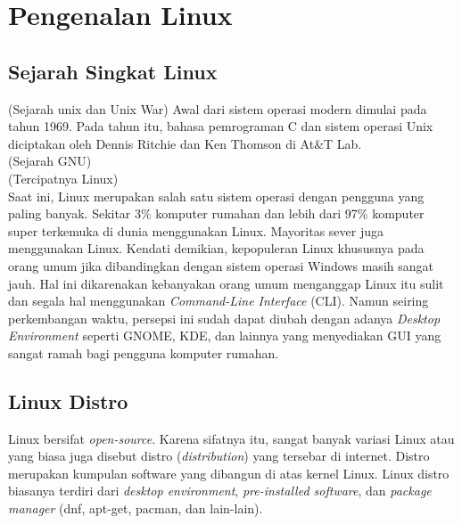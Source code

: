 \chapter{Pengenalan Linux}

\section{Sejarah Singkat Linux}
(Sejarah unix dan Unix War) Awal dari sistem operasi modern dimulai pada tahun 1969. Pada tahun itu, bahasa pemrograman C dan sistem operasi Unix diciptakan oleh Dennis Ritchie dan Ken Thomson di At\&T Lab. \\ 

(Sejarah GNU) \\ 

(Tercipatnya Linux) \\ 

Saat ini, Linux merupakan salah satu sistem operasi dengan pengguna yang paling banyak. Sekitar 3\% komputer rumahan dan lebih dari 97\% komputer super terkemuka di dunia menggunakan Linux. Mayoritas sever juga menggunakan Linux. Kendati demikian, kepopuleran Linux khususnya pada orang umum jika dibandingkan dengan sistem operasi Windows masih sangat jauh. Hal ini dikarenakan kebanyakan orang umum menganggap Linux itu sulit dan segala hal menggunakan \textit{Command-Line Interface} (CLI). Namun seiring perkembangan waktu, persepsi ini sudah dapat diubah dengan adanya \textit{Desktop Environment} seperti GNOME, KDE, dan lainnya yang menyediakan GUI yang sangat ramah bagi pengguna komputer rumahan.\\

\section{Linux Distro}
Linux bersifat \textit{open-source}. Karena sifatnya itu, sangat banyak variasi Linux atau yang biasa juga disebut distro (\textit{distribution}) yang tersebar di internet. Distro merupakan kumpulan software yang dibangun di atas kernel Linux. Linux distro biasanya terdiri dari \textit{desktop environment}, \textit{pre-installed software}, dan \textit{package manager} (dnf, apt-get, pacman, dan lain-lain).
